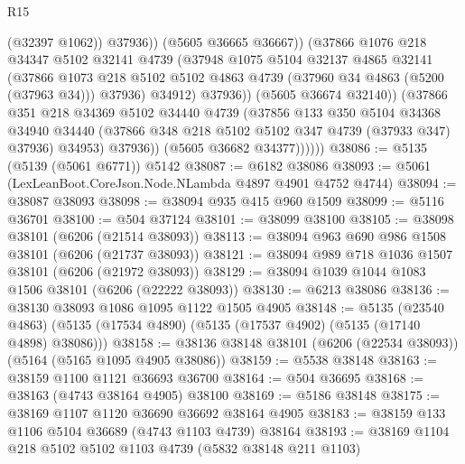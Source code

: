 \begin{lexlean}{R15}
\begin{coremodule}
{{{{{{{{{{{                            (@32397 @1062))
                          @37936))
                      (@5605 @36665 @36667))
                    (@37866
                      @1076
                      @218
                      @34347
                      @5102
                      @32141
                      @4739
                      (@37948
                        @1075
                        @5104
                        @32137
                        @4865
                        @32141
                        (@37866
                          @1073
                          @218
                          @5102
                          @5102
                          @4863
                          @4739
                          (@37960 @34 @4863 (@5200 (@37963 @34)))
                          @37936)
                        @34912)
                      @37936))
                  (@5605 @36674 @32140))
                (@37866
                  @351
                  @218
                  @34369
                  @5102
                  @34440
                  @4739
                  (@37856
                    @133
                    @350
                    @5104
                    @34368
                    @34940
                    @34440
                    (@37866 @348 @218 @5102 @5102 @347 @4739 (@37933 @347) @37936)
                    @34953)
                  @37936))
              (@5605 @36682 @34377))))))
@38086 := @5135 (@5139 (@5061 @6771)) @5142
@38087 := @6182 @38086
@38093 := @5061 (LexLeanBoot.CoreJson.Node.NLambda @4897 @4901 @4752 @4744)
@38094 := @38087 @38093
@38098 := @38094 @935 @415 @960 @1509
@38099 := @5116 @36701
@38100 := @504 @37124
@38101 := @38099 @38100
@38105 := @38098 @38101 (@6206 (@21514 @38093))
@38113 := @38094 @963 @690 @986 @1508 @38101 (@6206 (@21737 @38093))
@38121 := @38094 @989 @718 @1036 @1507 @38101 (@6206 (@21972 @38093))
@38129 := @38094 @1039 @1044 @1083 @1506 @38101 (@6206 (@22222 @38093))
@38130 := @6213 @38086
@38136 := @38130 @38093 @1086 @1095 @1122 @1505 @4905
@38148 := @5135
    (@23540 @4863)
    (@5135 (@17534 @4890) (@5135 (@17537 @4902) (@5135 (@17140 @4898) @38086)))
@38158 := @38136 @38148 @38101 (@6206 (@22534 @38093)) (@5164 (@5165 @1095 @4905 @38086))
@38159 := @5538 @38148
@38163 := @38159 @1100 @1121 @36693 @36700
@38164 := @504 @36695
@38168 := @38163 (@4743 @38164 @4905) @38100
@38169 := @5186 @38148
@38175 := @38169 @1107 @1120 @36690 @36692 @38164 @4905
@38183 := @38159 @133 @1106 @5104 @36689 (@4743 @1103 @4739) @38164
@38193 := @38169 @1104 @218 @5102 @5102 @1103 @4739 (@5832 @38148 @211 @1103)
}}}}}}}}}}}
\end{coremodule}
\end{lexlean}

